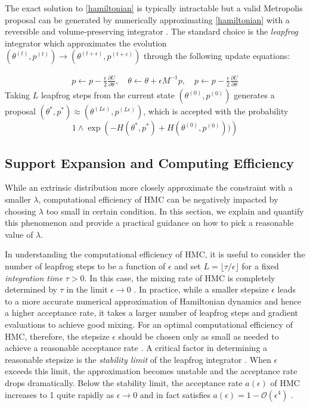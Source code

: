 \documentclass[10pt]{article}
\newcommand{\mc}[1]{\mathcal{#1}}
\DeclareMathOperator{\1}{\mathbbm{1}}
\newcommand{\dt}{\epsilon} %
\newcommand{\mass}{M} %
\begin{document}
The exact solution to \eqref{hamiltonian} is typically intractable but a valid Metropolis proposal can be generated by numerically approximating \eqref{hamiltonian} with a reversible and volume-preserving  integrator \citep{neal2011mcmc}. The standard choice is the \textit{leapfrog} integrator which approximates the evolution $(\theta^{(t)},p^{(t)}) \to (\theta^{(t + \dt)},p^{(t + \dt)})$ through the following update equations:

\begin{equation}
\begin{aligned}
\label{leap-frog}
p \leftarrow p - \frac{\dt}{2} \frac{\partial U}{\partial  \theta },\quad
\theta \leftarrow  \theta  + \dt \mass^{-1}p,\quad
p \leftarrow p -  \frac{\dt}{2}  \frac{\partial U}{\partial  \theta } 
\end{aligned}
\end{equation}
Taking $L$ leapfrog steps from the current state $(\theta^{(0)},p^{(0)})$ generates a proposal $(\theta^{*},p^{*}) \approx (\theta^{(L \dt)},p^{(L \dt)})$, which is accepted with the probability 
$$1\wedge \exp  \left( - H(\theta^{*},p^{*}) + H(\theta^{(0)},p^{(0)}))\right)$$


\subsection{Support Expansion and Computing Efficiency}

While an extrinsic distribution more closely approximate the constraint with a smaller $\lambda$, computational efficiency of HMC can be negatively impacted by choosing $\lambda$ too small in certain condition. In this section, we explain and quantify this phenomenon and provide a practical guidance on how to pick a reasonable value of $\lambda$.

In understanding the computational efficiency of HMC, it is useful to consider the number of leapfrog steps to be a function of $\dt$ and set $L = \lfloor \tau / \dt \rfloor$ for a fixed \textit{integration time} $\tau > 0$. In this case, the mixing rate of HMC is completely determined by $\tau$ in the limit $\dt \to 0$ \citep{betancourt17}. In practice, while a smaller stepsize $\dt$ leads to a more accurate numerical approximation of Hamiltonian dynamics and hence a higher acceptance rate, it takes a larger number of leapfrog steps and gradient evaluations to achieve good mixing. For an optimal computational efficiency of HMC, therefore, the stepsize $\dt$ should be chosen only as small as needed to achieve a reasonable acceptance rate \citep{beskos13, betancourt14}. A critical factor in determining a reasonable stepsize is the \textit{stability limit} of the leapfrog integrator \citep{neal2011mcmc}. When $\dt$ exceeds this limit, the approximation becomes unstable and the acceptance rate drops dramatically. Below the stability limit, the acceptance rate $a(\dt)$ of HMC increases to 1 quite rapidly as $\dt \to 0$ and in fact satisfies $a(\dt) = 1 - \mc O(\dt^4)$ \citep{beskos13}.
\end{document}
